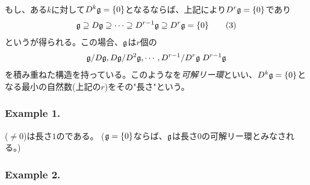 \documentclass[../main]{subfiles}
\begin{document}
\begin{definition}\label{Def:sol_Lie_alg}
  もし、ある$k$に対して$D^{k}\mathfrak{g}=\qty{0}$となるならば、上記により$D^{r}\mathfrak{g}=\qty{0}$であり
  \begin{align*}
    \mathfrak{g}\supseteq D\mathfrak{g}\supseteq \cdots \supseteq D^{r-1}\mathfrak{g} \supseteq D^{r}\mathfrak{g} = \qty{0}
    \tag{3}\label{eq:3_(3)}
  \end{align*}
  という{\列}が得られる。この場合、$\mathfrak{g}$は$r$個の{}
  \begin{align*}
    \mathfrak{g}/D\mathfrak{g},D\mathfrak{g}/D^{2}\mathfrak{g},\cdots,D^{r-1}/D^{r}\mathfrak{g} \; D^{r-1}\mathfrak{g}
  \end{align*}
  を積み重ねた構造を持っている。このような{}を\emph{可解リー環}といい、$D^{k}\mathfrak{g}=\qty{0}$となる最小の自然数(上記の$r$)をその"長さ"という。
\end{definition}

\subsubsection*{Example 1.}
\begin{remark}
  {}($\neq\qty{0}$)は長さ$1$の{}である。
  ($\mathfrak{g}=\qty{0}$ならば、$\mathfrak{g}$は長さ$0$の可解リー環とみなされる。)
\end{remark}

\subsubsection*{Example 2.}
\end{document}
